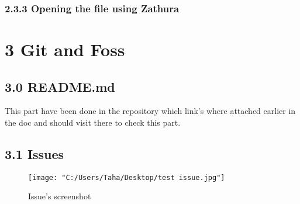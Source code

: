 \documentclass{article}
\begin{document}
\subsubsection*{\large 2.3.3 Opening the file using Zathura}


\section*{\Huge 3 Git and Foss}
\subsection*{\Large 3.0 README.md}
This part have been done in the repository which link's where attached earlier in the doc and should visit there to check this part.
\subsection*{\Large 3.1 Issues}
\begin{figure}[h]
    \centering
    \texttt{[image: "C:/Users/Taha/Desktop/test issue.jpg"]}
    \caption{Issue's screenshot}
    \label{fig:enter-label}
\end{figure}
\end{document}
